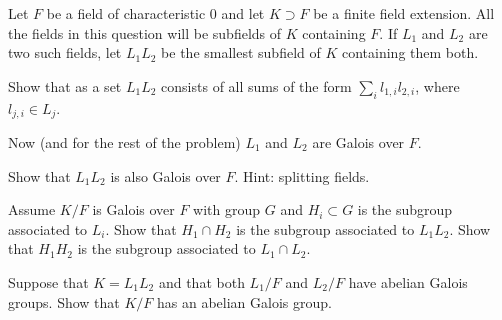 Let $F$ be a field of characteristic $0$ and let $K\supset F$ be a
finite field extension. All the fields in this question will be
subfields of $K$ containing $F$. If $L_1$ and $L_2$ are two such
fields, let $L_1L_2$ be the smallest subfield of $K$ containing them
both.
\begin{alist}
\item Show that as a set $L_1L_2$ consists of all sums of the form
$\sum_{i}l_{1,i}l_{2,i}$, where $l_{j,i}\in L_j$.
\item Now (and for the rest of the problem) $L_1$ and $L_2$ are Galois
over $F$.

Show that $L_1L_2$ is also Galois over $F$. Hint: splitting fields.
\item Assume $K/F$ is Galois over $F$ with group $G$ and $H_i\subset
G$ is the subgroup associated to $L_i$. Show that $H_1\cap H_2$ is the
subgroup associated to $L_1L_2$. Show that $H_1H_2$ is the subgroup
associated to $L_1\cap L_2$.
\item Suppose that $K=L_1L_2$ and that both $L_1/F$ and $L_2/F$ have
abelian Galois groups. Show that $K/F$ has an abelian Galois group.
\end{alist}
